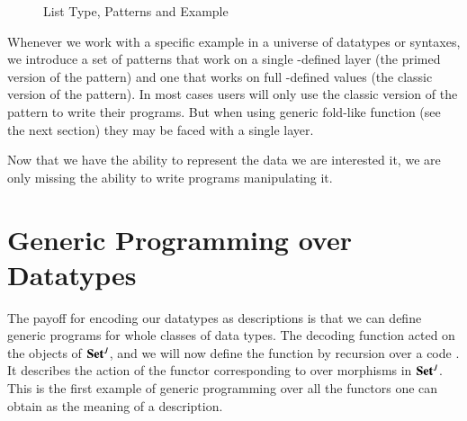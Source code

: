 \begin{figure}[h]
\begin{minipage}{0.5\textwidth}
\end{minipage}\begin{minipage}{0.5\textwidth}
\end{minipage}

\begin{minipage}{0.5\textwidth}
\end{minipage}\begin{minipage}{0.5\textwidth}
\end{minipage}
\caption{List Type, Patterns and Example}\label{figure:listpat}
\end{figure}

\begin{convention}
Whenever we work with a specific example in a universe of datatypes or
syntaxes, we introduce a set of patterns that work on a single
-defined layer (the primed version of the pattern) and
one that works on full -defined values (the classic version
of the pattern).
In most cases users will only use the classic version of the pattern
to write their programs. But when using generic fold-like function
(see the next section) they may be faced with a single layer.
\end{convention}

Now that we have the ability to represent the data we are interested it,
we are only missing the ability to write programs manipulating it.

\section{Generic Programming over Datatypes}

The payoff for encoding our datatypes as descriptions is that we can
define generic programs for whole classes of data types. The decoding
function  acted on the objects of ${\mathbf{Set}}{}^J$, and we will now
define the function  by recursion over a code .
It describes the action of the functor corresponding to  over
morphisms in ${\mathbf{Set}}{}^J$. This is the first example of generic
programming over all the functors one can obtain as the meaning
of a description.

